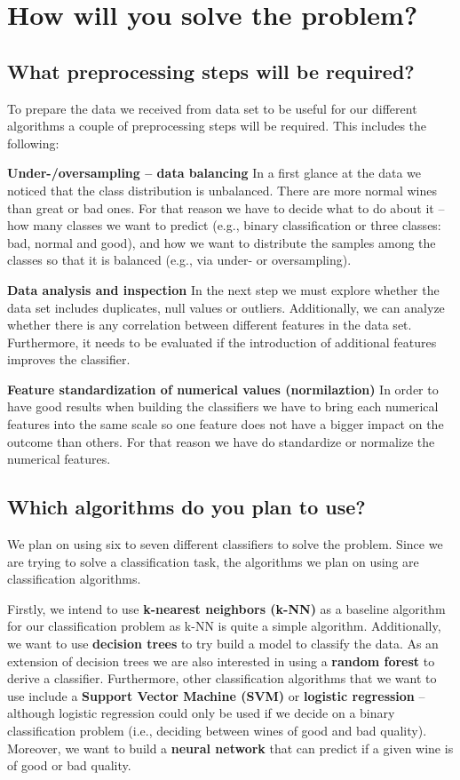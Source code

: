\documentclass[11pt,titlepage,oneside,openany]{article}
\begin{document}
\section{How will you solve the problem?}
\subsection{What preprocessing steps will be required?}
To prepare the data we received from data set to be useful for our different algorithms a couple of preprocessing
steps will be required. This includes the following:

\textbf{Under-/oversampling -- data balancing} In a first glance at the data we noticed that the class distribution is
unbalanced. There are more normal wines than great or bad ones. For that reason we have to decide what to do about it -- how many classes we want to predict (e.g., binary classification or three classes: bad, normal and good), and how we want to distribute the samples among the classes so that it is balanced (e.g., via under- or oversampling).

\textbf{Data analysis and inspection} In the next step we must explore whether the data set includes duplicates, null values or outliers. Additionally, we can analyze whether there is any correlation between different features in the data set. Furthermore, it needs to be evaluated if the introduction of additional features improves the classifier.

\textbf{Feature standardization of numerical values (normilaztion)} In order to have good results when building the classifiers we have to bring each numerical features into the same scale so one feature does not have a bigger impact on the outcome than others. For that reason we have do standardize or normalize the numerical features.

\subsection{Which algorithms do you plan to use?}
We plan on using six to seven different classifiers to solve the problem. Since we 
are trying to solve a classification task, the algorithms we plan on using are classification
algorithms.

Firstly, we intend to use \textbf{k-nearest neighbors (k-NN)} as a baseline
algorithm for our classification problem as k-NN is quite a simple algorithm.
Additionally, we want to use \textbf{decision trees} to try build a model to classify the
data. As an extension of decision trees we are also interested in using a \textbf{random forest}
to derive a classifier.
Furthermore, other classification algorithms that we want to use include a \textbf{Support Vector Machine (SVM)}
or \textbf{logistic regression} -- although logistic regression could only be used if we decide on
a binary classification problem (i.e., deciding between wines of good and bad quality).
Moreover, we want to build a \textbf{neural network} that can predict if a given wine is of good or bad quality.
\end{document}
